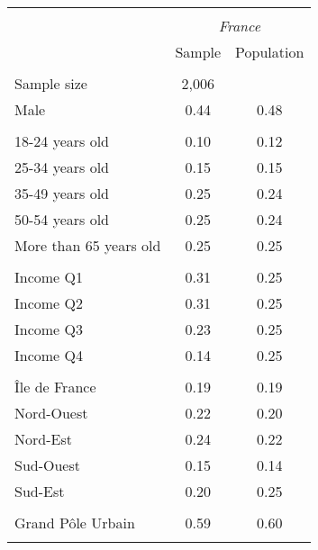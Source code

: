 \begin{tabular}{lcc}
\toprule
\hline \\[-1.8ex]
\multicolumn{1}{c}{\em{ }} & \multicolumn{2}{c}{\em{France}}\\
\cmidrule(l{3pt}r{3pt}){2-3}
\noalign{\smallskip}  & Sample & Population\\
\hline \\[-1.8ex] 
Sample size & 2,006 &  \\
\noalign{\smallskip}\hline \noalign{\smallskip}Male & 0.44 & 0.48\\ 
\\
18-24 years old & 0.10 & 0.12\\
25-34 years old & 0.15 & 0.15\\
35-49 years old & 0.25 & 0.24\\
50-54 years old & 0.25 & 0.24\\
More than 65 years old & 0.25 & 0.25\\ 
\\
Income Q1 & 0.31 & 0.25\\
Income Q2 & 0.31 & 0.25\\
Income Q3 & 0.23 & 0.25\\
Income Q4 & 0.14 & 0.25\\
\\
Île de France & 0.19 & 0.19\\
Nord-Ouest & 0.22 & 0.20\\
Nord-Est & 0.24 & 0.22\\
Sud-Ouest & 0.15 & 0.14\\
Sud-Est & 0.20 & 0.25\\
\\
Grand Pôle Urbain & 0.59 & 0.60\\
\\
\bottomrule
\end{tabular}
